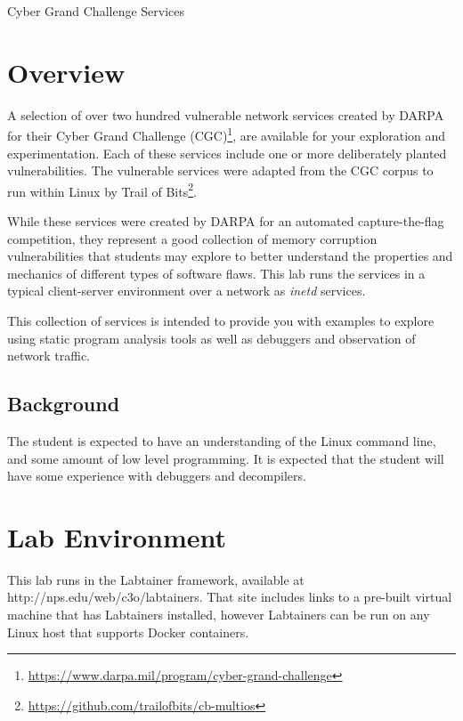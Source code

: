 


\begin{center}
{\LARGE Cyber Grand Challenge Services}
\vspace{0.1in}\\
\end{center}

\section{Overview}
A selection of over two hundred vulnerable network services created by DARPA for their 
Cyber Grand Challenge (CGC)\footnote{\url{https://www.darpa.mil/program/cyber-grand-challenge}}, 
are available for your exploration and experimentation.  Each of these services include one or more
deliberately planted vulnerabilities.  The vulnerable services were adapted from 
the CGC corpus to run within Linux by Trail of Bits\footnote{\url{https://github.com/trailofbits/cb-multios}}.

While these services were created by DARPA for an automated capture-the-flag competition, they represent
a good collection of memory corruption vulnerabilities that students may explore to better understand
the properties and mechanics of different types of software flaws.  This lab runs the services
in a typical client-server environment over a network as \textit{inetd} services.

This collection of services is intended to provide you with examples to explore using static program
analysis tools as well as debuggers and observation of network traffic.

\subsection {Background}
The student is expected to have an understanding of the Linux command line, and some amount of low level programming.
It is expected that the student will have some experience with debuggers and decompilers.


\section{Lab Environment}
\label{environment}
This lab runs in the Labtainer framework,
available at http://nps.edu/web/c3o/labtainers.
That site includes links to a pre-built virtual machine
that has Labtainers installed, however Labtainers can
be run on any Linux host that supports Docker containers.

